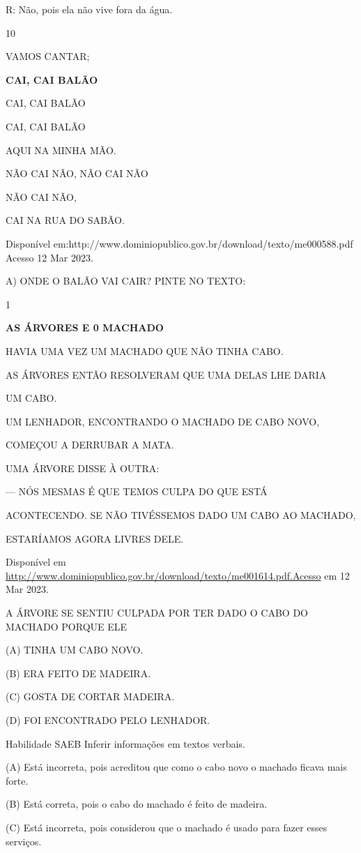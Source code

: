 {{{{{{R: Não, pois ela não vive fora da água.

\num{10}

VAMOS CANTAR;

\textbf{CAI, CAI BALÃO}

CAI, CAI BALÃO

CAI, CAI BALÃO

AQUI NA MINHA MÃO.

NÃO CAI NÃO, NÃO CAI NÃO

NÃO CAI NÃO,

CAI NA RUA DO SABÃO.

Disponível
em:http://www.dominiopublico.gov.br/download/texto/me000588.pdf Acesso
12 Mar 2023.

A) ONDE O BALÃO VAI CAIR? PINTE NO TEXTO:


\num{1}

\textbf{AS ÁRVORES E 0 MACHADO}

HAVIA UMA VEZ UM MACHADO QUE NÃO TINHA CABO.

AS ÁRVORES ENTÃO RESOLVERAM QUE UMA DELAS LHE DARIA

UM CABO.

UM LENHADOR, ENCONTRANDO O MACHADO DE CABO NOVO,

COMEÇOU A DERRUBAR A MATA.

UMA ÁRVORE DISSE À OUTRA:

--- NÓS MESMAS É QUE TEMOS CULPA DO QUE ESTÁ

ACONTECENDO. SE NÃO TIVÉSSEMOS DADO UM CABO AO MACHADO,

ESTARÍAMOS AGORA LIVRES DELE.

Disponível em
\url{http://www.dominiopublico.gov.br/download/texto/me001614.pdf.Acesso}
em 12 Mar 2023.

A ÁRVORE SE SENTIU CULPADA POR TER DADO O CABO DO MACHADO PORQUE ELE

(A) TINHA UM CABO NOVO.

(B) ERA FEITO DE MADEIRA.

(C) GOSTA DE CORTAR MADEIRA.

(D) FOI ENCONTRADO PELO LENHADOR.

Habilidade SAEB Inferir informações em textos verbais.

(A) Está incorreta, pois acreditou que como o cabo novo o machado ficava
mais forte.

(B) Está correta, pois o cabo do machado é feito de madeira.

(C) Está incorreta, pois considerou que o machado é usado para fazer
esses serviços.

}}}}}}
